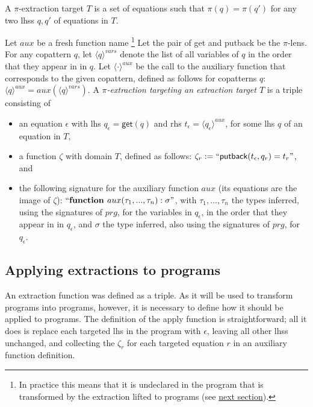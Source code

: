 \begin{definition}
A $\pi$-extraction target $T$ is a set of equations such that $\pi(q) = \pi(q')$ for any two lhss $q, q'$ of equations in $T$.
\end{definition}

\begin{definition}
Let $aux$ be a fresh function name \footnote{In practice this means that it is undeclared in the program that is transformed by the extraction lifted to programs (see \hyperref[ssec:extrprog]{next section}).} Let the pair of \textsf{get} and \textsf{putback} be the $\pi$-lens. For any copattern $q$, let $\langle q \rangle^{vars}$ denote the list of all variables of $q$ in the order that they appear in in $q$. Let $\langle \cdot \rangle^{aux}$ be the call to the auxiliary function that corresponds to the given copattern, defined as follows for copatterns $q$: $\langle q \rangle^{aux} = aux(\langle q \rangle^{vars})$. A \textit{$\pi$-extraction targeting an extraction target $T$} is a triple consisting of
\begin{itemize}
\item an equation $\epsilon$ with lhs $q_\epsilon = \textsf{get}(q)$ and rhs $t_\epsilon = \langle q_\epsilon \rangle^{aux}$, for some lhs $q$ of an equation in $T$,
\item a function $\zeta$ with domain $T$, defined as follows: $\zeta_r := ``\textsf{putback}(t_\epsilon, q_r) = t_r  "$, and
\item the following signature for the auxiliary function $aux$ (its equations are the image of $\zeta$): $`` \textrm{\textbf{function }} aux(\tau_1, ..., \tau_n): \sigma "$, with $\tau_1, ..., \tau_n$ the types inferred, using the signatures of $prg$, for the variables in $q_\epsilon$, in the order that they appear in in $q_\epsilon$, and $\sigma$ the type inferred, also using the signatures of $prg$, for $q_\epsilon$.
\end{itemize}
\end{definition}

\subsection{Applying extractions to programs}
\label{ssec:extrprog}

An extraction function was defined as a triple. As it will be used to transform programs into programs, however, it is necessary to define how it should be applied to programs. The definition of the apply function is straightforward; all it does is replace each targeted lhs in the program with $\epsilon$, leaving all other lhss unchanged, and collecting the $\zeta_r$ for each targeted equation $r$ in an auxiliary function definition.

